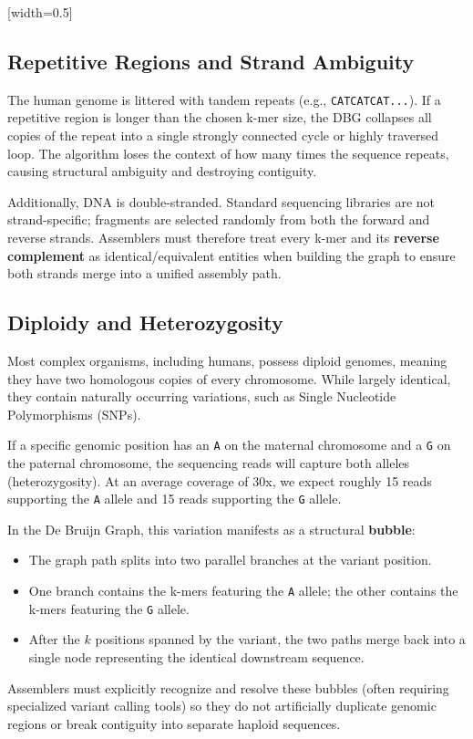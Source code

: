 [width=0.5\textwidth]

\subsection{Repetitive Regions and Strand Ambiguity}
The human genome is littered with tandem repeats (e.g., \texttt{CATCATCAT...}). If a repetitive region is longer than the chosen k-mer size, the DBG collapses all copies of the repeat into a single strongly connected cycle or highly traversed loop. The algorithm loses the context of how many times the sequence repeats, causing structural ambiguity and destroying contiguity.

Additionally, DNA is double-stranded. Standard sequencing libraries are not strand-specific; fragments are selected randomly from both the forward and reverse strands. Assemblers must therefore treat every k-mer and its \textbf{reverse complement} as identical/equivalent entities when building the graph to ensure both strands merge into a unified assembly path.

\subsection{Diploidy and Heterozygosity}
Most complex organisms, including humans, possess diploid genomes, meaning they have two homologous copies of every chromosome. While largely identical, they contain naturally occurring variations, such as Single Nucleotide Polymorphisms (SNPs). 

If a specific genomic position has an \texttt{A} on the maternal chromosome and a \texttt{G} on the paternal chromosome, the sequencing reads will capture both alleles (heterozygosity). At an average coverage of 30x, we expect roughly 15 reads supporting the \texttt{A} allele and 15 reads supporting the \texttt{G} allele.

In the De Bruijn Graph, this variation manifests as a structural \textbf{bubble}:
\begin{itemize}
    \item The graph path splits into two parallel branches at the variant position.
    \item One branch contains the k-mers featuring the \texttt{A} allele; the other contains the k-mers featuring the \texttt{G} allele.
    \item After the $k$ positions spanned by the variant, the two paths merge back into a single node representing the identical downstream sequence.
\end{itemize}
\sta Assemblers must explicitly recognize and resolve these bubbles (often requiring specialized variant calling tools) so they do not artificially duplicate genomic regions or break contiguity into separate haploid sequences.

